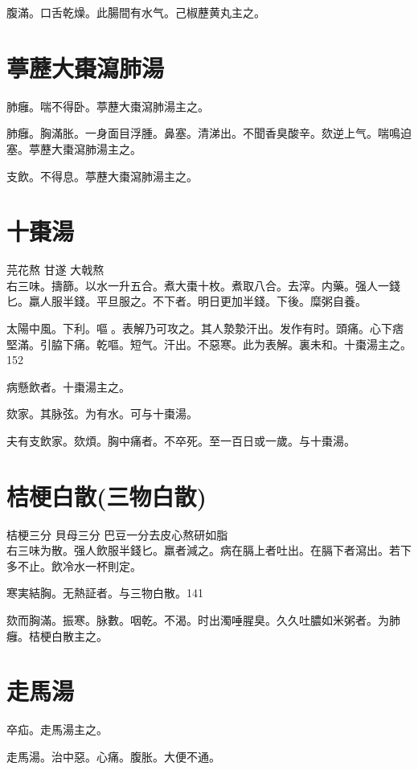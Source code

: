 腹滿。口舌乾燥。此腸間有水气。己椒藶黄丸主之。

\section{葶藶大棗瀉肺湯}

肺癰。喘不得卧。葶藶大棗瀉肺湯主之。

肺癰。胸滿胀。一身面目浮腫。鼻塞。清涕出。不聞香臭酸辛。欬逆上气。喘鳴迫塞。葶藶大棗瀉肺湯主之。

支飲。不得息。葶藶大棗瀉肺湯主之。

\section{十棗湯}

芫花{\scriptsize 熬} 甘遂 大戟{\scriptsize 熬}\\
右三味。擣篩。以水一升五合。煮大棗十枚。煮取八合。去滓。内藥。强人一錢匕。羸人服半錢。平旦服之。不下者。明日更加半錢。下後。糜粥自養。

太陽中風。下利。嘔{\sungtpii 𠱘}。表解乃可攻之。其人漐漐汗出。发作有时。頭痛。心下痞堅滿。引脇下痛。乾嘔。短气。汗出。不惡寒。此为表解。裏未和。十棗湯主之。152

病懸飲者。十棗湯主之。

欬家。其脉弦。为有水。可与十棗湯。

夫有支飲家。欬煩。胸中痛者。不卒死。至一百日{\khaaitp 或}一歲。与十棗湯。

\section{桔梗白散(三物白散)}

桔梗{\scriptsize 三分} 貝母{\scriptsize 三分} 巴豆{\scriptsize 一分去皮心熬研如脂}\\
右三味为散。强人飲服半錢匕。羸者減之。病在膈上者吐出。在膈下者瀉出。若下多不止。飲冷水一杯則定。

寒実結胸。无熱証者。与三物白散。141

欬而胸滿。振寒。脉數。咽乾。不渴。时出濁唾腥臭。久久吐膿如米粥者。为肺癰。桔梗白散主之。

\section{走馬湯}

卒疝。走馬湯主之。{\wuben}

走馬湯。治中惡。心痛。腹胀。大便不通。{\dengben}

